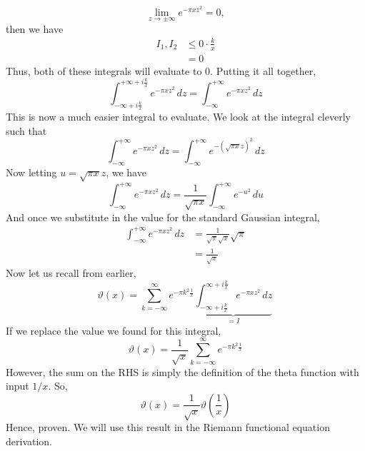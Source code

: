 \documentclass{article}
\begin{document}
\begin{equation*}
    \lim_{z\rightarrow \pm \infty}  e^{-\pi xz^2} = 0,
\end{equation*}
then we have
\begin{equation*}
    \begin{split}
        I_1,I_2 &\leq 0\cdot \frac{k}{x}\\
        &= 0
    \end{split}
\end{equation*}
Thus, both of these integrals will evaluate to 0. Putting it all together, 
\begin{equation*}
     \int_{-\infty+i\frac{k}{x}}^{+\infty+i\frac{k}{x}} e^{-\pi xz^2}\,dz=\int_{-\infty}^{+\infty} e^{-\pi xz^2}\,dz
\end{equation*} 
This is now a much easier integral to evaluate. We look at the integral cleverly such that
\begin{equation*}
    \int_{-\infty}^{+\infty} e^{-\pi xz^2}\,dz=\int_{-\infty}^{+\infty} e^{-(\sqrt{\pi x}z)^2}\,dz
\end{equation*}
Now letting $u=\sqrt{\pi x}z$, we have
\begin{equation*}
     \int_{-\infty}^{+\infty} e^{-\pi xz^2}\,dz=\frac{1}{\sqrt{\pi x}}\int_{-\infty}^{+\infty} e^{-u^2}\,du
\end{equation*}
And once we substitute in the value for the standard Gaussian integral, 
\begin{equation*}
\begin{split}
    \int_{-\infty}^{+\infty} e^{-\pi xz^2}\,dz&=\frac{1}{\sqrt{\pi}\sqrt{x}}\sqrt{\pi} \\
    &= \frac{1}{\sqrt{x}}
    \end{split}
\end{equation*}
Now let us recall from earlier,
\begin{equation*}
    \vartheta(x)=\sum_{k=-\infty}^{\infty} e^{-\pi k^2 \frac{1}{x}}\underbrace{\int_{-\infty+i\frac{k}{x}}^{\infty+i\frac{k}{x}} e^{-\pi xz^2}\,dz}_{=I}  \, 
\end{equation*} 
If we replace the value we found for this integral, 
\begin{equation*}
    \vartheta(x)=\frac{1}{\sqrt{x}}\sum_{k=-\infty}^{\infty} e^{-\pi k^2 \frac{1}{x}}
\end{equation*}
However, the sum on the RHS is simply the definition of the theta function with input $1/x$. So,
\begin{equation*}
     \vartheta(x)=\frac{1}{\sqrt{x}}\vartheta\left(\frac{1}{x}\right)
\end{equation*}
Hence, proven. We will use this result in the Riemann functional equation derivation. 
\end{document}
